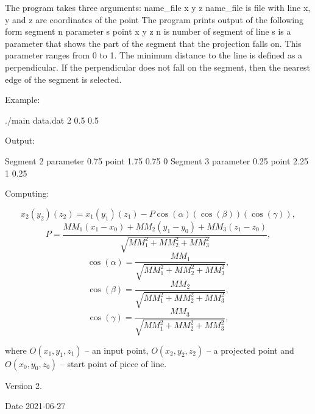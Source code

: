 The program takes three arguments\+: name\+\_\+file x y z name\+\_\+file is file with line x, y and z are coordinates of the point The program prints output of the following form segment n parameter s point x y z n is number of segment of line s is a parameter that shows the part of the segment that the projection falls on. This parameter ranges from 0 to 1. The minimum distance to the line is defined as a perpendicular. If the perpendicular does not fall on the segment, then the nearest edge of the segment is selected.

Example\+: \begin{DoxyVerb}./main data.dat 2 0.5 0.5 
\end{DoxyVerb}
 Output\+: \begin{DoxyVerb}Segment 2 parameter 0.75 point 1.75 0.75 0
Segment 3 parameter 0.25 point 2.25 1 0.25
\end{DoxyVerb}
 Computing\+:

\[ x_2 (y_2) (z_2) = x_1 (y_1) (z_1) - P \cos(\alpha) (\cos(\beta)) (\cos(\gamma)), \] \[ P = \frac{MM_1(x_1 - x_0) + MM_2(y_1 - y_0) + MM_3(z_1 - z_0)}{\sqrt{MM_1^2 + MM_2^2 + MM_3^2}}, \] \[ \cos(\alpha) = \frac{MM_1}{\sqrt{MM_1^2 + MM_2^2 + MM_3^2}}, \] \[ \cos(\beta) = \frac{MM_2}{\sqrt{MM_1^2 + MM_2^2 + MM_3^2}}, \] \[ \cos(\gamma) = \frac{MM_3}{\sqrt{MM_1^2 + MM_2^2 + MM_3^2}}, \]

where $O(x_1, y_1, z_1)$ -- an input point, $O(x_2, y_2, z_2)$ -- a projected point and $ O(x_0, y_0, z_0)$ -- start point of piece of line.

\begin{DoxyVersion}{Version}
2. 
\end{DoxyVersion}
\begin{DoxyDate}{Date}
2021-\/06-\/27 
\end{DoxyDate}
